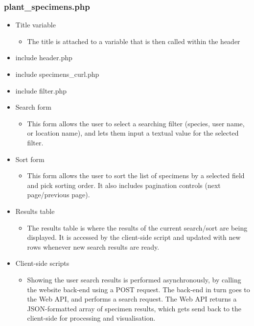     \subsubsection{plant\_specimens.php}
        \begin{itemize}
            \item Title variable
            \begin{itemize}
                \item The title is attached to a variable that is then called within the header
            \end{itemize}
            \item include header.php
            \item include specimens\_curl.php
            \item include filter.php
            \item Search form
            \begin{itemize}
                \item This form allows the user to select a searching filter (species, user name, or location name), and lets them input a textual value for the selected filter.
            \end{itemize}
            \item Sort form
            \begin{itemize}
                \item This form allows the user to sort the list of specimens by a selected field and pick sorting order. It also includes pagination controls (next page/previous page).
            \end{itemize}
            \item Results table
            \begin{itemize}
                \item The results table is where the results of the current search/sort are being displayed. It is accessed by the client-side script and updated with new rows whenever
                new search results are ready.
            \end{itemize}
            \item Client-side scripts
            \begin{itemize}
                \item Showing the user search results is performed asynchronously, by calling the website back-end using a POST request. The back-end in turn goes to the Web API, and
                performs a search request. The Web API returns a JSON-formatted array of specimen results, which gets send back to the client-side for processing and visualisation.
                

\end{itemize}
\end{itemize}
